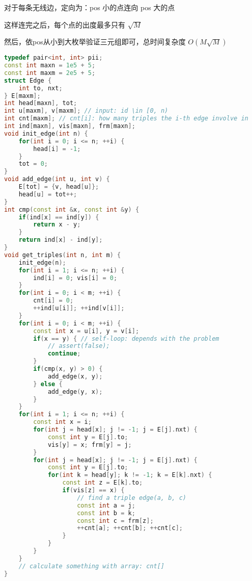 对于每条无线边，定向为：pos 小的点连向 pos 大的点

这样连完之后，每个点的出度最多只有 $\sqrt{M}$

然后，依pos从小到大枚举验证三元组即可，总时间复杂度 $O(M\sqrt{M})$

\begin{lstlisting}[language=C++]
typedef pair<int, int> pii;
const int maxn = 1e5 + 5;
const int maxm = 2e5 + 5;
struct Edge {
    int to, nxt;
} E[maxm];
int head[maxn], tot;
int u[maxm], v[maxm]; // input: id \in [0, n)
int cnt[maxm]; // cnt[i]: how many triples the i-th edge involve in
int ind[maxn], vis[maxn], frm[maxn];
void init_edge(int n) {
    for(int i = 0; i <= n; ++i) {
        head[i] = -1;
    }
    tot = 0;
}
void add_edge(int u, int v) {
    E[tot] = {v, head[u]};
    head[u] = tot++;
}
int cmp(const int &x, const int &y) {
    if(ind[x] == ind[y]) {
        return x - y;
    }
    return ind[x] - ind[y];
}
void get_triples(int n, int m) {
    init_edge(n);
    for(int i = 1; i <= n; ++i) {
        ind[i] = 0; vis[i] = 0;
    }
    for(int i = 0; i < m; ++i) {
        cnt[i] = 0;
        ++ind[u[i]]; ++ind[v[i]];
    }
    for(int i = 0; i < m; ++i) {
        const int x = u[i], y = v[i];
        if(x == y) { // self-loop: depends with the problem
            // assert(false);
            continue;
        }
        if(cmp(x, y) > 0) {
            add_edge(x, y);
        } else {
            add_edge(y, x);
        }
    }
    for(int i = 1; i <= n; ++i) {
        const int x = i;
        for(int j = head[x]; j != -1; j = E[j].nxt) {
            const int y = E[j].to;
            vis[y] = x; frm[y] = j;
        }
        for(int j = head[x]; j != -1; j = E[j].nxt) {
            const int y = E[j].to;
            for(int k = head[y]; k != -1; k = E[k].nxt) {
                const int z = E[k].to;
                if(vis[z] == x) {
                    // find a triple edge(a, b, c)
                    const int a = j;
                    const int b = k;
                    const int c = frm[z];
                    ++cnt[a]; ++cnt[b]; ++cnt[c];
                }
            }
        }
    }
    // calculate something with array: cnt[]
}
\end{lstlisting}